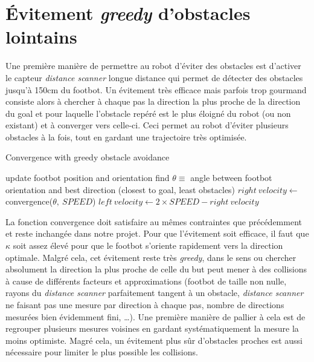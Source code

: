 \section{Évitement \emph{greedy} d'obstacles lointains}

Une première manière de permettre au robot d'éviter des obstacles est d'activer le capteur \emph{distance scanner} longue distance qui permet de détecter des obstacles jusqu'à 150cm du footbot. Un évitement très efficace mais parfois trop gourmand consiste alors à chercher à chaque pas la direction la plus proche de la direction du goal et pour laquelle l'obstacle repéré est le plus éloigné du robot (ou non existant) et à converger vers celle-ci. Ceci permet au robot d'éviter plusieurs obstacles à la fois, tout en gardant une trajectoire très optimisée.

\begin{algorithm}                    
\caption{Convergence with greedy obstacle avoidance}
\label{greedyConvergence}
\begin{algorithmic}
    \STATE update footbot position and orientation
    \STATE find \( \theta \equiv\) angle between footbot orientation and best direction (closest to goal, least obstacles)
    \STATE \( right\:velocity \gets\) convergence(\(\theta,\:SPEED\))
    \STATE \( left\:velocity \gets 2 \times SPEED-right\:velocity\) 
  \ENDWHILE
\end{algorithmic}
\end{algorithm}

La fonction convergence doit satisfaire au mêmes contraintes que précédemment et reste inchangée dans notre projet. Pour que l'évitement soit efficace, il faut que $\kappa$ soit assez élevé pour que le footbot s'oriente rapidement vers la direction optimale. Malgré cela, cet évitement reste très \emph{greedy}, dans le sens ou chercher absolument la direction la plus proche de celle du but peut mener à des collisions à cause de différents facteurs et approximations (footbot de taille non nulle, rayons du \emph{distance scanner} parfaitement tangent à un obstacle, \emph{distance scanner} ne faisant pas une mesure par direction à chaque pas, nombre de directions mesurées bien évidemment fini, \ldots). Une première manière de pallier à cela est de regrouper plusieurs mesures voisines en gardant systématiquement la mesure la moins optimiste. Magré cela, un évitement plus sûr d'obstacles proches est aussi nécessaire pour limiter le plus possible les collisions.

